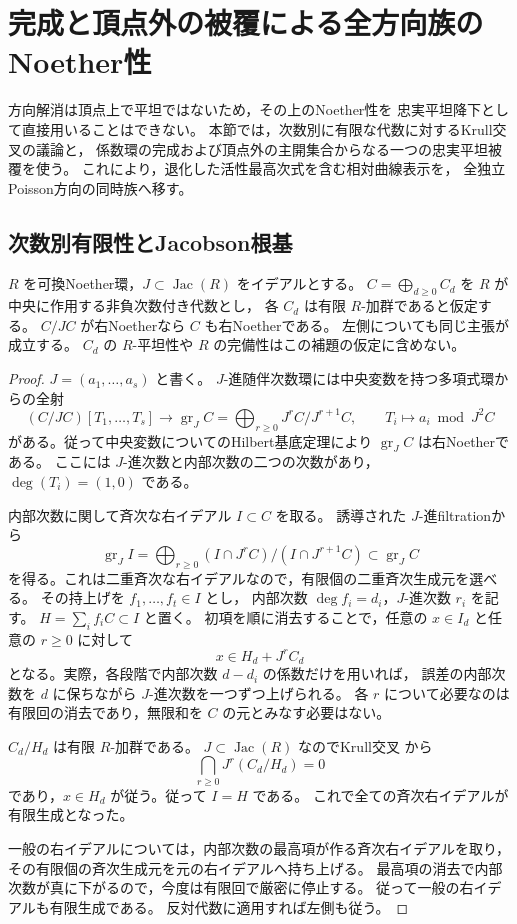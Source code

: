 \section{完成と頂点外の被覆による全方向族のNoether性}
\label{sec:noether-descent}

方向解消は頂点上で平坦ではないため，その上のNoether性を
忠実平坦降下として直接用いることはできない。
本節では，次数別に有限な代数に対するKrull交叉の議論と，
係数環の完成および頂点外の主開集合からなる一つの忠実平坦被覆を使う。
これにより，退化した活性最高次式を含む相対曲線表示を，
全独立Poisson方向の同時族へ移す。

\subsection{次数別有限性とJacobson根基}

\begin{lemma}\label{lem:graded-jacobson-noether}
$R$ を可換Noether環，$J\subset\operatorname{Jac}(R)$ をイデアルとする。
$C=\bigoplus_{d\ge0}C_d$ を $R$ が中央に作用する非負次数付き代数とし，
各 $C_d$ は有限 $R$-加群であると仮定する。
$C/JC$ が右Noetherなら $C$ も右Noetherである。
左側についても同じ主張が成立する。
$C_d$ の $R$-平坦性や $R$ の完備性はこの補題の仮定に含めない。
\end{lemma}
\begin{proof}
$J=(a_1,\ldots,a_s)$ と書く。
$J$-進随伴次数環には中央変数を持つ多項式環からの全射
\[
 (C/JC)[T_1,\ldots,T_s]\longrightarrow
 \operatorname{gr}_J C
   =\bigoplus_{r\ge0}J^rC/J^{r+1}C,
 \qquad T_i\longmapsto a_i\bmod J^2C
\]
がある。従って中央変数についてのHilbert基底定理により
$\operatorname{gr}_J C$ は右Noetherである。
ここには $J$-進次数と内部次数の二つの次数があり，
$\deg(T_i)=(1,0)$ である。

内部次数に関して斉次な右イデアル $I\subset C$ を取る。
誘導された $J$-進filtrationから
\[
 \operatorname{gr}_J I
 =\bigoplus_{r\ge0}
       (I\cap J^rC)/(I\cap J^{r+1}C)
 \subset\operatorname{gr}_J C
\]
を得る。これは二重斉次な右イデアルなので，有限個の二重斉次生成元を選べる。
その持上げを $f_1,\ldots,f_t\in I$ とし，
内部次数 $\deg f_i=d_i$，$J$-進次数 $r_i$ を記す。
$H=\sum_i f_iC\subset I$ と置く。
初項を順に消去することで，任意の $x\in I_d$ と任意の $r\ge0$ に対して
\[
 x\in H_d+J^rC_d
\]
となる。実際，各段階で内部次数 $d-d_i$ の係数だけを用いれば，
誤差の内部次数を $d$ に保ちながら $J$-進次数を一つずつ上げられる。
各 $r$ について必要なのは有限回の消去であり，無限和を $C$ の元とみなす必要はない。

$C_d/H_d$ は有限 $R$-加群である。
$J\subset\operatorname{Jac}(R)$ なのでKrull交叉
\cite[Tag~00IQ, Lemma~10.51.5(2)]{StacksProject}から
\[
 \bigcap_{r\ge0}J^r(C_d/H_d)=0
\]
であり，$x\in H_d$ が従う。従って $I=H$ である。
これで全ての斉次右イデアルが有限生成となった。

一般の右イデアルについては，内部次数の最高項が作る斉次右イデアルを取り，
その有限個の斉次生成元を元の右イデアルへ持ち上げる。
最高項の消去で内部次数が真に下がるので，今度は有限回で厳密に停止する。
従って一般の右イデアルも有限生成である。
反対代数に適用すれば左側も従う。
\end{proof}

